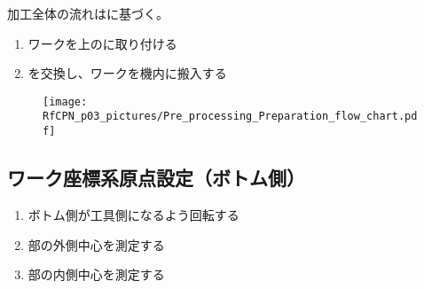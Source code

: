 



加工全体の流れはに基づく。



\begin{enumerate}[label*=\sarrow]
\item {}ワークを\Table 上の\Jig に取り付ける
\item \Palette を交換し、ワークを機内に搬入する
\end{enumerate}


\begin{figure}[ht]%
\begin{FigShortbox}[valign=top]%
\texttt{[image: RfCPN\_p03\_pictures/Pre\_processing\_Preparation\_flow\_chart.pdf]}%
\setlength{\abovecaptionskip}{10pt}%
\end{FigShortbox}%
\end{figure}%



\clearpage


\subsection{ワーク座標系原点設定（ボトム側）}
\begin{enumerate}[label*=\sarrow]
\item ボトム側が工具側になるよう回転する
\item \BottomEndFace 部の外側中心を測定する
\item \BottomEndFace 部の内側中心を測定する
\end{enumerate}


